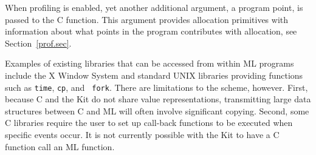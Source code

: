 \documentclass[12pt]{book}
\begin{document}
When profiling is enabled, yet another additional argument, a program
point, is passed to the C function. This argument provides allocation
primitives with information about what points in the program
contributes with allocation, see Section~\ref{prof.sec}.

Examples of existing libraries that can be accessed from within ML
programs include the X Window System and standard UNIX libraries
providing functions such as {\tt time}, {\tt cp}, and {\tt
fork}. There are limitations to the scheme, however. First, because C
and the Kit do not share value representations, transmitting large
data structures between C and ML will often involve significant
copying. Second, some C libraries require the user to set up
%
call-back functions to be executed when specific events occur. It is
not currently possible with the Kit to have a C function call an ML
function.

\end{document}
